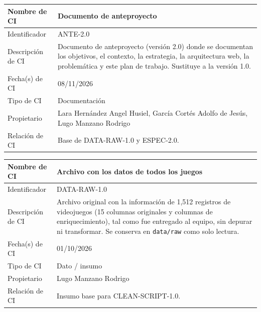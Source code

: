 \documentclass[letterpaper,11pt]{article}
\begin{document}
\bigskip
\noindent\begin{minipage}{\textwidth}
\small\renewcommand{\arraystretch}{1.9}
\begin{tabularx}{\textwidth}{|p{3.3cm}|Y|}
\hline
Nombre de CI & Documento de anteproyecto \\ \hline
Identificador & ANTE-2.0 \\ \hline
Descripción de CI & Documento de anteproyecto (versión 2.0) donde se documentan los objetivos, el contexto, la estrategia, la arquitectura web, la problemática y este plan de trabajo. Sustituye a la versión 1.0. \\ \hline
Fecha(s) de CI & 08/11/2026 \\ \hline
Tipo de CI & Documentación \\ \hline
Propietario & Lara Hernández Angel Husiel, García Cortés Adolfo de Jesús, Lugo Manzano Rodrigo \\ \hline
Relación de CI & Base de DATA-RAW-1.0 y ESPEC-2.0. \\ \hline
\end{tabularx}
\end{minipage}\par\bigskip
\noindent\begin{minipage}{\textwidth}
\small\renewcommand{\arraystretch}{1.9}
\begin{tabularx}{\textwidth}{|p{3.3cm}|Y|}
\hline
Nombre de CI & Archivo con los datos de todos los juegos \\ \hline
Identificador & DATA-RAW-1.0 \\ \hline
Descripción de CI & Archivo original con la información de 1,512 registros de videojuegos (15 columnas originales y columnas de enriquecimiento), tal como fue entregado al equipo, sin depurar ni transformar. Se conserva en \texttt{data/raw} como solo lectura. \\ \hline
Fecha(s) de CI & 01/10/2026 \\ \hline
Tipo de CI & Dato / insumo \\ \hline
Propietario & Lugo Manzano Rodrigo \\ \hline
Relación de CI & Insumo base para CLEAN-SCRIPT-1.0. \\ \hline
\end{tabularx}
\end{minipage}\par\bigskip
\end{document}
